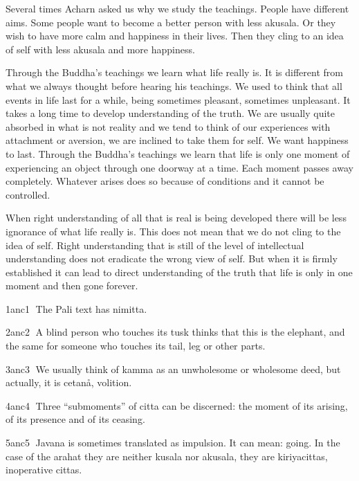 \documentclass[10pt,a4paper,final]{article}
\begin{document}
Several times Acharn asked us why we study
the teachings. People have different aims. Some people want to become a
better person with less akusala. Or they wish to have more calm and
happiness in their lives. Then they cling to an idea of self with less
akusala and more happiness. 

Through the Buddha's teachings we learn what
life really is. It is different from what we always thought before
hearing his teachings. We used to think that all events in life last for
a while, being sometimes pleasant, sometimes unpleasant. It takes a long
time to develop understanding of the truth. We are usually quite
absorbed in what is not reality and we tend to think of our experiences
with attachment or aversion, we are inclined to take them for self. We
want happiness to last. Through the Buddha's teachings we learn that
life is only one moment of experiencing an object through one doorway at
a time. Each moment passes away completely. Whatever arises does so
because of conditions and it cannot be controlled. 

When right understanding of all that is real
is being developed there will be less ignorance of what life really is.
This does not mean that we do not cling to the idea of self. Right
understanding that is still of the level of intellectual understanding
does not eradicate the wrong view of self. But when it is firmly
established it can lead to direct understanding of the truth that life
is only in one moment and then gone forever. 



\protect\hyperlinksdfootnote1anc1 The
Pali text has nimitta.

\protect\hyperlinksdfootnote2anc2 A
blind person who touches its tusk thinks that this is the elephant, and
the same for someone who touches its tail, leg or other parts. 

\protect\hyperlinksdfootnote3anc3 We
usually think of kamma as an unwholesome or wholesome deed, but
actually, it is cetanå, volition. 

\protect\hyperlinksdfootnote4anc4 Three
``submoments'' of citta can be discerned: the moment of its arising, of
its presence and of its ceasing. 

\protect\hyperlinksdfootnote5anc5
Javana is sometimes translated as impulsion. It can mean:
going. In the case of the arahat they are neither kusala nor akusala,
they are kiriyacittas, inoperative cittas. 
\end{document}
